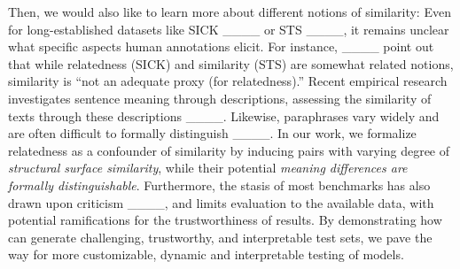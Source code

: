 Then, we would also like to learn more about different notions of similarity: Even for long-established datasets like SICK ____ or STS ____, it remains unclear what specific aspects human annotations elicit. For instance, ____ point out that while relatedness (SICK) and similarity (STS) are somewhat related notions, similarity is ``not an adequate proxy (for relatedness).'' Recent empirical research investigates sentence meaning through descriptions, assessing the similarity of texts through these descriptions ____. Likewise, paraphrases vary widely and are often difficult to formally distinguish ____. In our work, we formalize relatedness as a confounder of similarity by inducing pairs with varying degree of \textit{structural surface similarity}, while their potential \textit{meaning differences are formally distinguishable}. Furthermore, the stasis of most benchmarks has also drawn upon criticism ____, and limits evaluation to the available data, with potential ramifications for the trustworthiness of results. By demonstrating how \model can generate challenging, trustworthy, and interpretable test sets, we pave the way for more customizable, dynamic and interpretable testing of models.